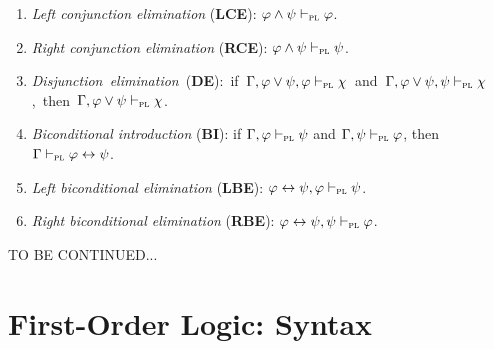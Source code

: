 \documentclass[a4paper, 11pt]{article} %
\begin{document}
\begin{enumerate}[itemsep=2pt]
  \item \textit{Left conjunction elimination} (\textbf{LCE}): $\varphi \wedge \psi \vdash_{\textsc{pl}} \varphi$. 
  \item \textit{Right conjunction elimination} (\textbf{RCE}): $\varphi \wedge \psi \vdash_{\textsc{pl}} \psi$. 
  \item \mbox{\textit{Disjunction elimination} (\textbf{DE}): if $\Gamma, \varphi \vee \psi, \varphi \vdash_{\textsc{pl}} \chi$ and $\Gamma, \varphi \vee \psi, \psi \vdash_{\textsc{pl}} \chi$, then $\Gamma, \varphi \vee \psi \vdash_{\textsc{pl}} \chi$.} 
  \item \textit{Biconditional introduction} (\textbf{BI}): if $\Gamma, \varphi \vdash_{\textsc{pl}} \psi$ and $\Gamma, \psi \vdash_{\textsc{pl}} \varphi$, then $\Gamma \vdash_{\textsc{pl}} \varphi \leftrightarrow \psi$. 
  \item \textit{Left biconditional elimination} (\textbf{LBE}): $\varphi \leftrightarrow \psi, \varphi \vdash_{\textsc{pl}} \psi$.
  \item \textit{Right biconditional elimination} (\textbf{RBE}): $\varphi \leftrightarrow \psi, \psi \vdash_{\textsc{pl}} \varphi$.
\end{enumerate}


\pagebreak
\noindent
TO BE CONTINUED...
\pagebreak





\section*{\sc First-Order Logic: Syntax}
\end{document}
